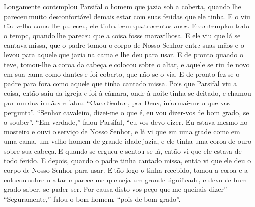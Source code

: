 Longamente contemplou Parsifal o homem que jazia sob a coberta, quando lhe
pareceu muito desconfortável demais estar com suas feridas que ele tinha. E o
viu tão velho como lhe pareceu, ele tinha bem quatrocentos anos. E
contemplou todo o tempo, quando lhe pareceu que a coisa fosse maravilhosa. E
ele viu que lá se cantava missa, que o padre tomou o corpo de Nosso Senhor
entre suas mãos e o levou para aquele que jazia na cama e lhe deu para usar. E
de pronto quando o teve, tomou-lhe a coroa da cabeça e colocou sobre o altar, e
aquele se riu de novo em sua cama como dantes e foi coberto, que não se o via.
E de pronto fez-se o padre para fora como aquele que tinha cantado missa. 
Pois que Parsifal viu a coisa, então saiu da igreja e foi à câmara, onde
à noite tinha se deitado, e chamou por um dos irmãos e falou: “Caro Senhor, por
Deus, informai-me o que vos pergunto”. “Senhor cavaleiro, dizei-me o que é, eu
vou dizer-vos de bom grado, se o souber”. “Em verdade,” falou Parsifal, “eu
vos devo dizer. Eu estava mesmo no mosteiro e ouvi o serviço de Nosso Senhor, e
lá vi que em uma grade como em uma cama, um velho homem de grande idade jazia,
e ele tinha uma coroa de ouro sobre sua cabeça. E quando se ergueu e sentou-se
lá, então vi que ele estava de todo ferido. E depois, quando o padre tinha
cantado missa, então vi que ele deu o corpo de Nosso Senhor para usar. E tão
logo o tinha recebido, tomou a coroa e a colocou sobre o altar e parece-me que
seja um grande significado, e devo de bom grado saber, se puder ser. Por causa
disto vos peço que me queirais dizer”. “Seguramente,” falou o bom homem, “pois
de bom grado”.

